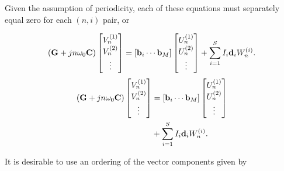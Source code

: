 Given the
assumption of periodicity, each of these equations must separately equal zero for each \( ( n, i ) \) pair, or

\singleAndDoubleColumnVariations
{
\begin{dmath}\label{eqn:ece1254projectReport:540}
\lr{
\BG + j n \omega_0 \BC
}
\begin{bmatrix}
V_n^{(1)} \\
V_n^{(2)} \\
\vdots \\
\end{bmatrix}
=
[\Bb_i \cdots \Bb_M]
\begin{bmatrix}
U_n^{(1)} \\
U_n^{(2)} \\
\vdots \\
\end{bmatrix} 
+ \sum_{i = 1}^S I_i \Bd_i
W_n^{(i)}
.
\end{dmath}
}
{
\begin{equation}\label{eqn:ece1254projectReport:540}
\begin{aligned}
\lr{
\BG + j n \omega_0 \BC
}
\begin{bmatrix}
V_n^{(1)} \\
V_n^{(2)} \\
\vdots \\
\end{bmatrix}
&=
[\Bb_i \cdots \Bb_M]
\begin{bmatrix}
U_n^{(1)} \\
U_n^{(2)} \\
\vdots \\
\end{bmatrix} \\
&+ \sum_{i = 1}^S I_i \Bd_i
W_n^{(i)}
.
\end{aligned}
\end{equation}
}


It is desirable to use an ordering of the vector components given by


